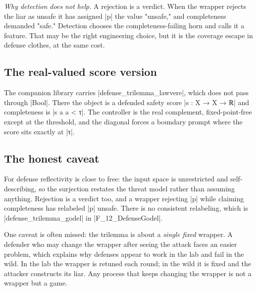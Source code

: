 \documentclass{memoir}
\begin{document}
\emph{Why detection does not help.} A rejection is a verdict. When the wrapper
rejects the liar as unsafe it has assigned \LeanVerb|p| the value "unsafe," and
completeness demanded "safe." Detection chooses the completeness-failing horn
and calls it a feature. That may be the right engineering choice, but it is the
coverage escape in defense clothes, at the same cost.



\subsection{The real-valued score version}\label{Two--Schemas--of--Impossibility-005F-005F-005F--Machine--Checked--Limits--of--Trustworthy--Machine--Learning-005F-005F-005F--and--Why--They--Tighten--with--Capability----Three--Trilemmata-005F-005F-005F--One--Theorem----The--Defense--Trilemma----The--real--valued--score--version}

The companion library carries \LeanVerb|defense_trilemma_lawvere|, which does not pass
through \LeanVerb|Bool|. There the object is a defended safety score \LeanVerb|s : X → X → ℝ| and
completeness is \LeanVerb|s a a < τ|. The controller is the real complement,
fixed-point-free except at the threshold, and the diagonal forces a boundary
prompt where the score sits exactly at \LeanVerb|τ|.



\subsection{The honest caveat}\label{Two--Schemas--of--Impossibility-005F-005F-005F--Machine--Checked--Limits--of--Trustworthy--Machine--Learning-005F-005F-005F--and--Why--They--Tighten--with--Capability----Three--Trilemmata-005F-005F-005F--One--Theorem----The--Defense--Trilemma----The--honest--caveat}

For defense reflectivity is close to free: the input space is unrestricted and
self-describing, so the surjection restates the threat model rather than
assuming anything. Rejection is a verdict too, and a wrapper rejecting \LeanVerb|p| while
claiming completeness has relabeled \LeanVerb|p| unsafe. There is no consistent
relabeling, which is \LeanVerb|defense_trilemma_godel| in \LeanVerb|F_12_DefenseGodel|.

One caveat is often missed: the trilemma is about a \emph{single fixed} wrapper. A
defender who may change the wrapper after seeing the attack faces an easier
problem, which explains why defenses appear to work in the lab and fail in the
wild. In the lab the wrapper is retuned each round; in the wild it is fixed and
the attacker constructs its liar. Any process that keeps changing the wrapper is
not a wrapper but a game.
\end{document}
